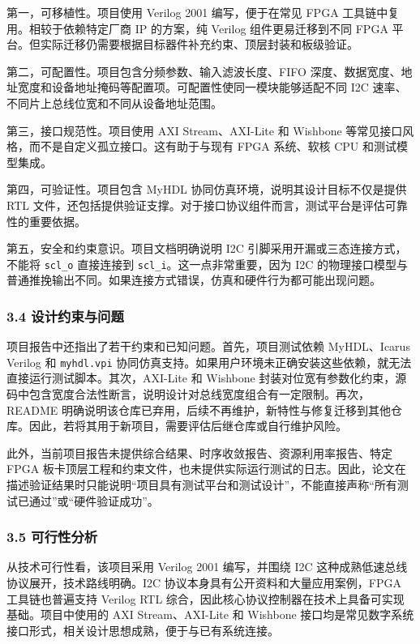 第一，可移植性。项目使用 Verilog 2001 编写，便于在常见 FPGA 工具链中复用。相较于依赖特定厂商 IP 的方案，纯 Verilog 组件更易迁移到不同 FPGA 平台。但实际迁移仍需要根据目标器件补充约束、顶层封装和板级验证。

第二，可配置性。项目包含分频参数、输入滤波长度、FIFO 深度、数据宽度、地址宽度和设备地址掩码等配置项。可配置性使同一模块能够适配不同 I2C 速率、不同片上总线位宽和不同从设备地址范围。

第三，接口规范性。项目使用 AXI Stream、AXI-Lite 和 Wishbone 等常见接口风格，而不是自定义孤立接口。这有助于与现有 FPGA 系统、软核 CPU 和测试模型集成。

第四，可验证性。项目包含 MyHDL 协同仿真环境，说明其设计目标不仅是提供 RTL 文件，还包括提供验证支撑。对于接口协议组件而言，测试平台是评估可靠性的重要依据。

第五，安全和约束意识。项目文档明确说明 I2C 引脚采用开漏或三态连接方式，不能将 \texttt{scl\_o} 直接连接到 \texttt{scl\_i}。这一点非常重要，因为 I2C 的物理接口模型与普通推挽输出不同。如果连接方式错误，仿真和硬件行为都可能出现问题。

\subsubsection{3.4 设计约束与问题}\label{ux8bbeux8ba1ux7ea6ux675fux4e0eux95eeux9898}

项目报告中还指出了若干约束和已知问题。首先，项目测试依赖 MyHDL、Icarus Verilog 和 \texttt{myhdl.vpi} 协同仿真支持。如果用户环境未正确安装这些依赖，就无法直接运行测试脚本。其次，AXI-Lite 和 Wishbone 封装对位宽有参数化约束，源码中包含宽度合法性断言，说明设计对总线宽度组合有一定限制。再次，README 明确说明该仓库已弃用，后续不再维护，新特性与修复迁移到其他仓库。因此，若将其用于新项目，需要评估后继仓库或自行维护风险。

此外，当前项目报告未提供综合结果、时序收敛报告、资源利用率报告、特定 FPGA 板卡顶层工程和约束文件，也未提供实际运行测试的日志。因此，论文在描述验证结果时只能说明``项目具有测试平台和测试设计''，不能直接声称``所有测试已通过''或``硬件验证成功''。

\subsubsection{3.5 可行性分析}\label{ux53efux884cux6027ux5206ux6790}

从技术可行性看，该项目采用 Verilog 2001 编写，并围绕 I2C 这种成熟低速总线协议展开，技术路线明确。I2C 协议本身具有公开资料和大量应用案例，FPGA 工具链也普遍支持 Verilog RTL 综合，因此核心协议控制器在技术上具备可实现基础。项目中使用的 AXI Stream、AXI-Lite 和 Wishbone 接口均是常见数字系统接口形式，相关设计思想成熟，便于与已有系统连接。

